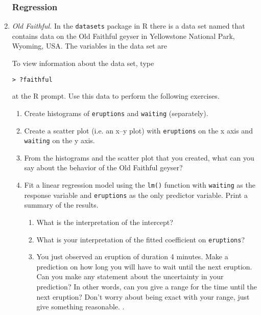 \begin{enumerate}

\subsubsection*{Regression}
  
\item \emph{Old Faithful.}
In the \texttt{datasets} package in R there is a data set named
 that
contains data on the Old Faithful geyser in Yellowstone National Park,
Wyoming, USA.  The variables in the data set are

To view information about the data set, type
\begin{Verbatim}
> ?faithful
\end{Verbatim}
at the R prompt. Use this data to perform the following exercises.

\begin{enumerate}
\item Create histograms of \texttt{eruptions} and \texttt{waiting}
  (separately). \label{hist}

\item Create a scatter plot (i.e. an x--y plot) with \texttt{eruptions}
  on the x axis and \texttt{waiting} on the y axis. \label{scat}

\item From the histograms and the scatter plot that you created, what
  can you say about the behavior of the Old Faithful geyser? \label{interp}
  
\item Fit a linear regression model using the \texttt{lm()} function
  with \texttt{waiting} as the response variable and \texttt{eruptions}
  as the only predictor variable. Print a summary of the results.
  \begin{enumerate}
  \item What is the interpretation of the intercept? \label{int}
  \item What is your interpretation of the fitted coefficient
    on \texttt{eruptions}? \label{dur}

  \item You just observed an eruption of duration 4 minutes.
    Make a prediction on how long you will have to wait until
    the next eruption. Can you make any statement about the
    uncertainty in your prediction? In other words, can
    you give a range for the time until the next eruption?
    Don't worry about being exact with your range, just
    give something reasonable. \label{pred}.
  \end{enumerate}
\end{enumerate}


\end{enumerate}
